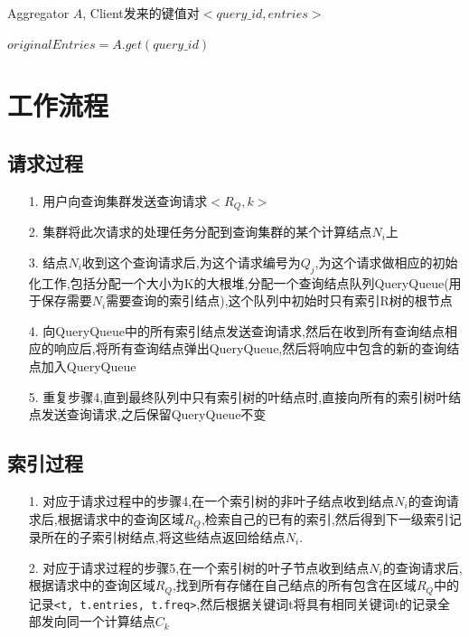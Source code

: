 \documentclass{elegantpaper}
\begin{document}
\begin{algorithm}

    \begin{algorithmic}[1]

        \Require Aggregator $A$, Client发来的键值对$<query\_id, entries>$

                \State $originalEntries = A.get(query\_id)$
                    \Else
                    \EndIf
                \EndFor
            \Else
            \EndIf
        \EndFunction
        
    \end{algorithmic}
    
\end{algorithm}

\section{工作流程}
\subsection{请求过程}
\begin{itemize}
    \item[1.] 用户向查询集群发送查询请求$<R_Q,k>$
    \item[2.] 集群将此次请求的处理任务分配到查询集群的某个计算结点$N_i$上
    \item[3.] 结点$N_i$收到这个查询请求后,为这个请求编号为$Q_j$,为这个请求做相应的初始化工作,包括分配一个大小为K的大根堆,分配一个查询结点队列QueryQueue(用于保存需要$N_i$需要查询的索引结点),这个队列中初始时只有索引R树的根节点
    \item[4.] 向QueryQueue中的所有索引结点发送查询请求,然后在收到所有查询结点相应的响应后,将所有查询结点弹出QueryQueue,然后将响应中包含的新的查询结点加入QueryQueue
    \item[5.] 重复步骤4,直到最终队列中只有索引树的叶结点时,直接向所有的索引树叶结点发送查询请求,之后保留QueryQueue不变
\end{itemize}
\subsection{索引过程}
\begin{itemize}
    \item[1.] 对应于请求过程中的步骤4,在一个索引树的非叶子结点收到结点$N_i$的查询请求后,根据请求中的查询区域$R_Q$,检索自己的已有的索引,然后得到下一级索引记录所在的子索引树结点,将这些结点返回给结点$N_i$.
    \item[2.] 对应于请求过程的步骤5,在一个索引树的叶子节点收到结点$N_i$的查询请求后,根据请求中的查询区域$R_Q$,找到所有存储在自己结点的所有包含在区域$R_Q$中的记录\verb|<t, t.entries, t.freq>|,然后根据关键词t将具有相同关键词t的记录全部发向同一个计算结点$C_k$
\end{itemize}
\end{document}
